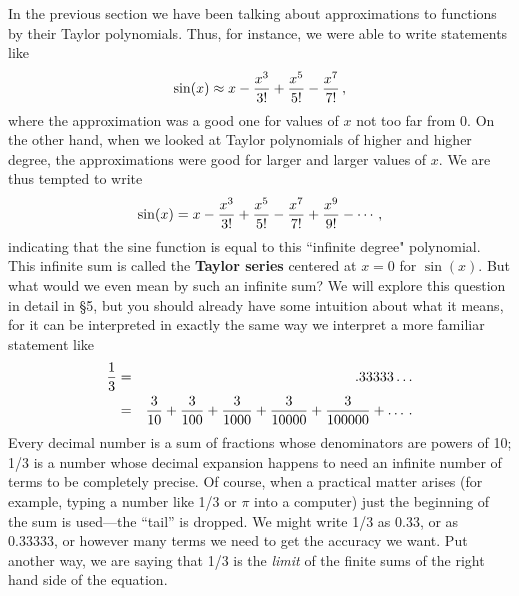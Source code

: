 {{{{In the previous section we have been talking about approximations to functions by their Taylor polynomials.  Thus, for instance, we were able to write statements like
\[
\sin(x) \approx x - {x^3 \over 3!} + {x^5 \over 5!} 
                - {x^7 \over 7!} \, ,
\]
where the approximation was a good one for values of $x$ not too far from 0.  On the other hand, when we looked at Taylor polynomials of higher and higher degree, the approximations were good for larger and larger values of $x$. We are thus tempted to write
\[
\sin(x) = x - {x^3 \over 3!} + {x^5 \over 5!} 
                - {x^7 \over 7!} + {x^9 \over 9!} - \cdots \, ,
\]
indicating that the sine function is equal to this ``infinite degree" polynomial.  This infinite sum is called the {\bf Taylor series} centered at $x=0$ for $\sin(x)$.  But what would we even mean by such an infinite sum?  
We will explore this question in detail in \S5, but you should already have some intuition about what it means, for it can be interpreted in exactly the same way we interpret a more familiar statement like
\begin{eqnarray*}
        {1 \over 3} &=& .33333 \ldots \\
        &=& {3 \over 10} + {3 \over 100} + {3 \over 1000}
                + {3 \over 10000} + {3 \over 100000} + \ldots \, .
        \end{eqnarray*}
Every decimal number is a sum of fractions whose denominators are powers of 10; 1/3 is a number whose decimal expansion happens to need an infinite number of terms to be completely precise.  Of course, when a practical matter arises (for example, typing a number like 1/3 or $\pi$ into a computer) just the beginning of the sum is used---the ``tail'' is dropped.  We might write 1/3 as 0.33, or as 0.33333, or however many terms we need to get the accuracy we want.  Put another way, we are saying that 1/3 is the {\em limit} of the finite sums of the right hand side of the equation. 

}}}}
